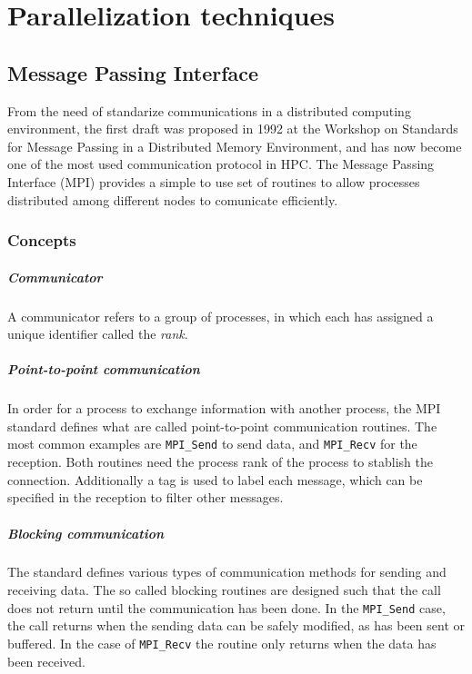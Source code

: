 \chapter{Parallelization techniques}
\label{ch:techniques}

\section{Message Passing Interface}

From the need of standarize communications in a distributed computing
environment, the first draft was proposed in 1992 at the Workshop on Standards
for Message Passing in a Distributed Memory Environment, and has now become one
of the most used communication protocol in HPC. The Message Passing Interface
(MPI) provides a simple to use set of routines to allow processes distributed
among different nodes to comunicate efficiently.

\subsection{Concepts}


\paragraph{Communicator} A communicator refers to a group of processes, in which
each has assigned a unique identifier called the \textit{rank}.

\paragraph{Point-to-point communication} In order for a process to exchange
information with another process, the MPI standard defines what are called
point-to-point communication routines. The most common examples are
\texttt{MPI\_Send} to send data, and \texttt{MPI\_Recv} for the reception.
Both routines need the process rank of the process to stablish the connection.
Additionally a tag is used to label each message, which can be specified in the
reception to filter other messages.

\paragraph{Blocking communication} The standard defines various types of
communication methods for sending and receiving data. The so called blocking
routines are designed such that the call does not return until the communication
has been done. In the \texttt{MPI\_Send} case, the call returns when the sending
data can be safely modified, as has been sent or buffered. In the case of
\texttt{MPI\_Recv} the routine only returns when the data has been received.

